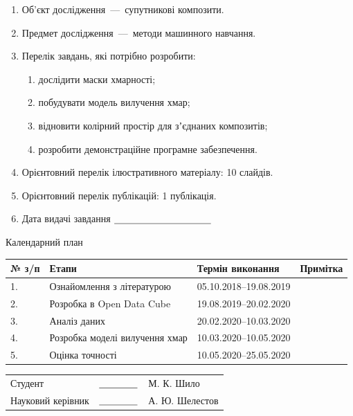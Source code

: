 \begin{enumerate}
    \item[3.]
	Об’єкт дослідження~---~супутникові композити.
    \item[4.]
	Предмет дослідження~---~методи машинного %
навчання.
    \item[5.]
	Перелік завдань, які потрібно розробити: %
\begin{enumerate}
	    \item
		  дослідити маски хмарності;
	    \item
		  побудувати модель вилучення хмар;
	    \item
		  відновити колірний простір для зʼєднаних %
композитів;
	    \item
		  розробити демонстраційне програмне %
забезпечення.
	\end{enumerate}
    \item[6.]
	Орієнтовний перелік ілюстративного матеріалу: %
10 слайдів.
    \item[7.]
	Орієнтовний перелік публікацій: 1 публікація.
    \item[8.]
	Дата видачі завдання ${\text{\underline{\hspace{10em}}}}$
\end{enumerate}

\begin{center}
    Календарний план
\end{center}

\begin{table}[H]
    \centering \begin{tabular}{|p{0.2in} | p{2.9in} | p{2.1in} | p{0.9in}|}
	\hline № з/п & Етапи & Термін виконання & Примітка \\ %
\hline 1.  & Ознайомлення
	з літературою & 05.10.2018--19.08.2019 & \\ \hline 2.  & Розробка %
в Open Data
	Cube & 19.08.2019--20.02.2020 & \\ \hline 3.  & Аналіз даних &
	20.02.2020--10.03.2020 & \\ \hline 4.  & Розробка моделі %
вилучення хмар &
	10.03.2020--10.05.2020 & \\ \hline 5.  & Оцінка точності &
	10.05.2020--25.05.2020 & \\ \hline
    \end{tabular}
\end{table}


\begin{table}[H]
    \centering \begin{tabular}{p{3.7in} p{1.2in} p{1.8in}}

    Студент & ${\text{\underline{\hspace{4em}}}}$ & М.  К.  Шило \\ %
Науковий керівник &
    ${\text{\underline{\hspace{4em}}}}$ & А.  Ю.  Шелестов \end{tabular}
\end{table}

\clearpage
